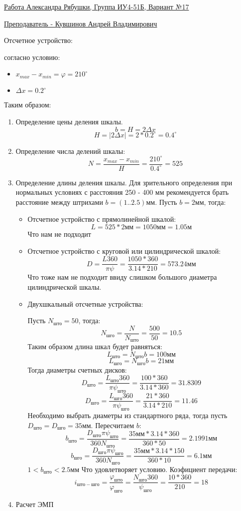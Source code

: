 \documentclass{article}
\begin{document}
\underline{Работа Александра Рябушки, Группа ИУ4-51Б, Вариант №17}

\underline{Преподаватель - Кувшинов Андрей Владимирович}

Отсчетное устройство:

согласно условию:
\begin{itemize}
	\item $x_{max} - x_{min} = \varphi = 210^{\circ}$
	\item $ \Delta x = 0.2^{\circ}$
\end{itemize}

Таким образом:
\begin{enumerate}
	\item Определение цены деления шкалы.
	$$
	b = H = 2 \Delta x
	$$
	$$
	H = |2 \Delta x| = 2 * 0.2^{\circ} = 0.4^{\circ}
	$$
	\item Определение числа делений шкалы:
	$$
	N = \frac{x_{max} - x_{min}}{H} = \frac{210^{\circ}}{0.4^{\circ}} = 525
	$$
	\item Определение длины деления шкалы. Для зрительного определения при нормальных условиях с расстояния 250 - 400 мм рекомендуется брать расстояние между штрихами $b = (1..2.5) мм$. Пусть $b = 2 мм$, тогда:
	\begin{itemize}
		\item Отсчетное устройство с прямолинейной шкалой:	
		$$
		L = 525 * 2 мм = 1050 мм = 1.05 м
		$$
		Что нам не подходит
		\item Отсчетное устройство с круговой или цилиндрической шкалой:
		$$
		D = \frac{L 360}{ \pi \psi} = \frac{1050 * 360}{3.14 * 210} = 573.24 мм
		$$
		Что тоже нам не подходит ввиду слишком большого диаметра цилиндрической шкалы.
		\item Двухшкальный отсчетные устройства:

		Пусть $N_{што} = 50$, тогда:
		$$
		N_{шго} = \frac{N}{N_{што}} = \frac{500}{50} = 10.5
		$$
		Таким образом длина шкал будет равняться:
		$$
		L_{што} = N_{што} b = 100 мм
		$$
		$$
		L_{шго} = N_{шго} b = 21 мм
		$$
		Тогда диаметры счетных дисков:
		$$
		D_{што} = \frac{L_{што} 360}{ \pi \psi_{што}} = \frac{100 * 360}{3.14 * 360} = 31.8309 
		$$
		$$
		D_{шго} = \frac{L_{шго} 360}{ \pi \psi_{шго}} = \frac{21 * 360}{3.14 * 210} = 11.46
		$$
		Необходимо выбрать диаметры из стандартного ряда, тогда пусть $D_{што} = D_{шго} = 35 мм$. Пересчитаем $b$:
		$$
		b_{што} = \frac{D_{што} \pi \psi_{што}}{360 N_{што}} = \frac{35 мм * 3.14 * 360}{360 * 50} = 2.1991 мм
		$$
		$$
		b_{шго} = \frac{D_{шго} \pi \psi_{шго}}{360 N_{шго}} = \frac{35 мм * 3.14 * 150}{360 * 10} = 6.1 мм
		$$
		$ 1 < b_{што} < 2.5 мм$ Что удовлетворяет условию. Коэфициент передачи:
		$$
		i_{што-шго} = \frac{ \varphi_{што}}{ \varphi_{шго}} = \frac{N_{шго} 360}{ \psi_{шго}} = \frac{10 * 360}{210} = 18 
		$$
	\end{itemize}
	\item Расчет ЭМП


\end{enumerate}
\end{document}
